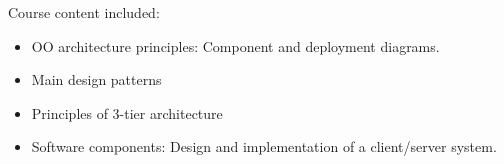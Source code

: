 Course content included:
\begin{itemize}
    \item OO architecture principles: Component and deployment diagrams.
    \item Main design patterns
    \item Principles of 3-tier architecture
    \item Software components: Design and implementation of a client/server system.
\end{itemize}